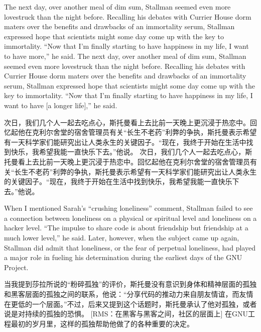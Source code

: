 \ifdefined\eng
\ifdefined\vone
The next day, over another meal of dim sum, Stallman seemed even more lovestruck than the night before. Recalling his debates with Currier House dorm maters over the benefits and drawbacks of an immortality serum, Stallman expressed hope that scientists might some day come up with the key to immortality. ``Now that I'm finally starting to have happiness in my life, I want to have more,'' he said.
\fi
\ifdefined\vtwo
The next day, over another meal of dim sum, Stallman seemed even more lovestruck than the night before. Recalling his debates with Currier House dorm maters over the benefits and drawbacks of an immortality serum, Stallman expressed hope that scientists might some day come up with the key to immortality. ``Now that I'm finally starting to have happiness in my life, I want to have [a longer life],'' he said.
\fi
\fi

\ifdefined\chs
\ifdefined\vone
次日，我们几个人一起去吃点心，斯托曼看上去比前一天晚上更沉浸于热恋中。回忆起他在克利尔舍堂的宿舍管理员有关``长生不老药''利弊的争执，斯托曼表示希望有一天科学家们能研究出让人类永生的关键因子。``现在，我终于开始在生活中找到快乐，我希望我能一直快乐下去。''他说。
\fi
\ifdefined\vtwo
次日，我们几个人一起去吃点心，斯托曼看上去比前一天晚上更沉浸于热恋中。回忆起他在克利尔舍堂的宿舍管理员有关``长生不老药''利弊的争执，斯托曼表示希望有一天科学家们能研究出让人类永生的关键因子。``现在，我终于开始在生活中找到快乐，我希望我能一直快乐下去。''他说。
\fi
\fi

\ifdefined\eng
When I mentioned Sarah's ``crushing loneliness'' comment, Stallman failed to see a connection between loneliness on a physical or spiritual level and loneliness on a hacker level. ``The impulse to share code is about friendship but friendship at a much lower level,'' he said. Later, however, when the subject came up again, Stallman did admit that loneliness, or the fear of perpetual loneliness, \ifdefined{} \fi
had played a major role in fueling his determination during the earliest days of the GNU Project.
\fi

\ifdefined\chs
当我提到莎拉所说的``粉碎孤独''的评价，斯托曼没有意识到身体和精神层面的孤独和黑客层面的孤独之间的联系，他说：``分享代码的推动力来自朋友情谊，而友情在更低的一个层面。''不过，后来又提到这个话题时，斯托曼承认了他对孤独，或者说是对持续的孤独的恐惧。
\ifdefined\vtwo
[RMS：在黑客与黑客之间，社区的层面上]
\fi
在GNU工程最初的岁月里，这样的孤独帮助他做了的各种重要的决定。
\fi

